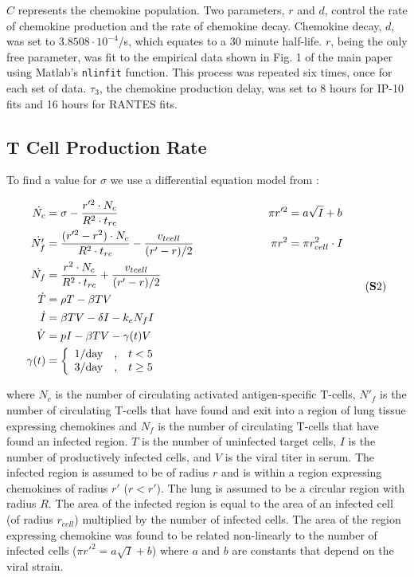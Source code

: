 \documentclass[10pt]{article}
\begin{document}
$C$ represents the chemokine population.  Two parameters, $r$ and $d$, control the rate of chemokine production and the rate of chemokine decay.  Chemokine decay, $d$, was set to $3.8508\cdot10^{-4}$/s, which equates to a 30 minute half-life. $r$, being the only free parameter, was fit to the empirical data shown in Fig. 1 of the main paper using Matlab's \texttt{nlinfit} function.  This process was repeated six times, once for each set of data.  $\tau_3$, the chemokine production delay, was set to 8 hours for IP-10 fits and 16 hours for RANTES fits.

\subsection{T Cell Production Rate}

To find a value for $\sigma$ we use a differential equation model from \cite{Miao20101}:

\begin{equation*}
\label{EqS2}
\begin{aligned}
\dot{N_{c}} &= \sigma - \frac{r'^{2} \cdot N_{c}}{R^{2} \cdot t_{rc}}    & \pi r'^{2} &= a \sqrt{I} + b \\
\dot{N'_{f}} &= \frac{(r'^{2} - r^{2}) \cdot N_{c}}{R^{2} \cdot t_{rc}} - \frac{v_{tcell}}{(r' - r) / 2} \hspace*{2cm}  & \pi r^{2} &= \pi r_{cell}^{2} \cdot I \\
\dot{N_{f}} &= \frac{r^{2} \cdot N_{c}}{R^{2} \cdot t_{rc}} + \frac{v_{tcell}}{(r' - r) / 2} \\
\dot{T} &= \rho T -\beta TV \\
\dot{I} &= \beta TV - \delta I - k_{e} N_{f} I \\
\dot{V} &= pI - \beta TV - \gamma (t) V \\
\gamma (t) &= \left\{ \begin{array}{rcl}
	1/\mbox{day} & \mbox{,}  & t < 5  \\
	3/\mbox{day} & \mbox{,} & t \geq 5  
	\end{array}\right. \\
\end{aligned}
\tag{\textbf{S}2}
\end{equation*}
\vspace{.05in}

where $N_{c}$ is the number of circulating activated antigen-specific T-cells, $N'_{f}$ is the number of circulating T-cells that have found and exit into a region of lung tissue expressing chemokines and $N_{f}$ is the number of circulating T-cells that have found an infected region. $T$ is the number of uninfected target cells, $I$ is the number of productively infected cells, and $V$ is the viral titer in serum. The infected region is assumed to be of radius $r$ and is within a region expressing chemokines of radius $r'$ ($r  < r'$). The lung is assumed to be a circular region with radius $R$. The area of the infected region is equal to the area of an infected cell (of radius $r_{cell}$) multiplied by the number of infected cells. The area of the region expressing chemokine was found to be related non-linearly to the number of infected cells ($\pi r'^{2} = a \sqrt{I} + b$) where $a$ and $b$ are constants that depend on the viral strain.
\end{document}

